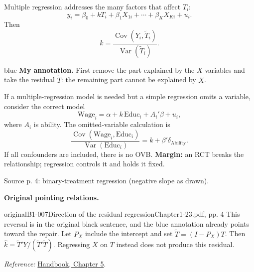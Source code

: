 {Multiple regression addresses the many factors that affect $T_i$:
\[y_i=\beta_0+kT_i+\beta_1X_{1i}+\cdots+\beta_KX_{Ki}+u_i.\]
 Then
\[k=\frac{\operatorname{Cov}(Y_i,\widetilde T_i)}{\operatorname{Var}(\widetilde T_i)}.\]
\begin{inkblock}{blue}
\textbf{My annotation.} First remove the part explained by the $X$ variables and take the residual $\widetilde T$: the remaining part cannot be explained by $X$.
\end{inkblock}

If a multiple-regression model is needed but a simple regression omits a variable, consider the correct model
\[\mathrm{Wage}_i=\alpha+k\,\mathrm{Educ}_i+A_i'\beta+u_i,\]
where $A_i$ is ability. The omitted-variable calculation is
\[\frac{\operatorname{Cov}(\mathrm{Wage}_i,\mathrm{Educ}_i)}{\operatorname{Var}(\mathrm{Educ}_i)}=k+\beta'\delta_{\mathrm{Ability}}.\]
  If all confounders are included, there is no OVB. \textbf{Margin:} an RCT breaks the relationship; regression controls it and holds it fixed.

\begin{center}
\par{\small Source p. 4: binary-treatment regression (negative slope as drawn).}
\end{center}
\par{}\smallskip\textbf{Original pointing relations.}\par\smallskip
{}
\begin{reviewnote}{original}{B1-007}{Direction of the residual regression}{Chapter1-23.pdf, pp. 4}
This reversal is in the original black sentence, and the blue annotation already points toward the repair. Let $P_X$ include the intercept and set $\widetilde T=(I-P_X)T$. Then $\hat k=\widetilde T'Y/(\widetilde T'\widetilde T)$. Regressing $X$ on $T$ instead does not produce this residual.
\par\smallskip\textit{Reference:} \href{https://matheusfacure.github.io/python-causality-handbook/05-The-Unreasonable-Effectiveness-of-Linear-Regression.html}{Handbook, Chapter 5}.
\end{reviewnote}

}
